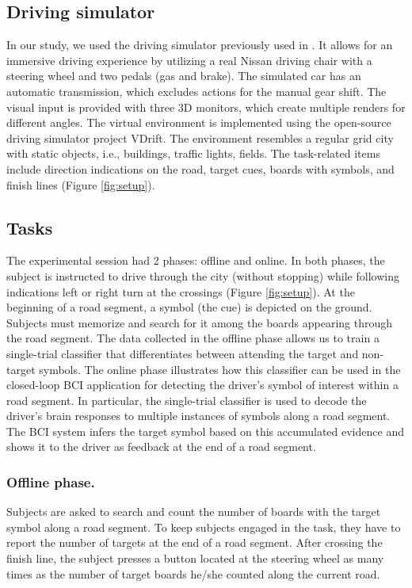 \documentclass[12pt]{iopart}
\begin{document}
\subsection{Driving simulator}
In our study, we used the driving simulator previously used in
\cite{khaliliardali_action_2015,zhang_eeg-based_2015,renold_eeg_2014}.
It allows for an immersive driving experience by utilizing
a real Nissan driving chair with a steering wheel and two pedals (gas and brake).
The simulated car has an automatic transmission, which excludes actions for
the manual gear shift.
The visual input is provided with three 3D monitors, which create multiple renders for
different angles. The virtual environment is implemented using
the open-source driving simulator project VDrift. %
The environment resembles a regular grid city with static objects, i.e.,
buildings, traffic lights, fields. The task-related items include
direction indications on the road, target cues, boards with symbols,
and finish lines (Figure \ref{fig:setup}).



\subsection{Tasks}
The experimental session had 2 phases: offline and online. In both phases, the subject is instructed to drive through the city (without stopping) while
following indications left or right turn at the crossings (Figure \ref{fig:setup}).
At the beginning of a road segment, a symbol (the cue) is depicted
on the ground. Subjects must memorize and search for it among
the boards appearing through the road segment. 
The data collected in the offline phase allows us to train a single-trial classifier that differentiates between attending the target and non-target symbols.
The online phase illustrates how this classifier can be used in the closed-loop BCI application for detecting the driver's symbol of interest within a road segment.
In particular, the single-trial classifier is used to decode the driver's brain responses to multiple instances of symbols along a road segment. The BCI system infers the target symbol based on this accumulated evidence and shows it to the driver as feedback at the end of a road segment.


\subsubsection*{Offline phase.}
Subjects are asked  to search and count the number of boards with the target symbol along a road segment. To keep subjects engaged in the task, they have to report the number of targets at the end of a road segment. After crossing the finish line, the subject presses 
a button located at the steering wheel as many times
as the number of target boards he/she counted along the current road.
\end{document}
